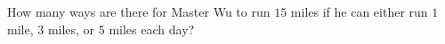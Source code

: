 How many ways are there for Master Wu to run $15$ miles if he can either run $1$ mile, $3$ miles, or $5$ miles each day?
